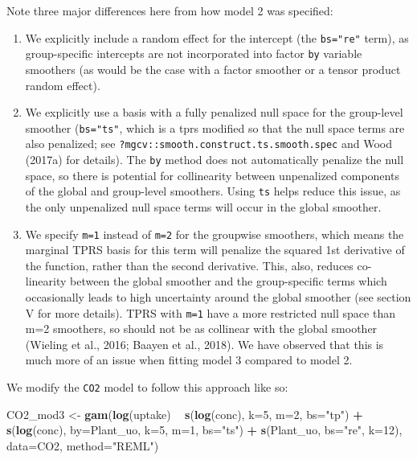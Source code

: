 \documentclass[12pt]{article}
\newenvironment{Shaded}{\begin{snugshade}}{\end{snugshade}}
\newcommand{\KeywordTok}[1]{\textcolor[rgb]{0.13,0.29,0.53}{\textbf{#1}}}
\newcommand{\DataTypeTok}[1]{\textcolor[rgb]{0.13,0.29,0.53}{#1}}
\newcommand{\DecValTok}[1]{\textcolor[rgb]{0.00,0.00,0.81}{#1}}
\newcommand{\StringTok}[1]{\textcolor[rgb]{0.31,0.60,0.02}{#1}}
\newcommand{\OperatorTok}[1]{\textcolor[rgb]{0.81,0.36,0.00}{\textbf{#1}}}
\newcommand{\NormalTok}[1]{#1}
\providecommand{\tightlist}{%
  \setlength{\itemsep}{0pt}\setlength{\parskip}{0pt}}
\begin{document}
Note three major differences here from how model 2 was specified:

\begin{enumerate}
\def\labelenumi{\arabic{enumi}.}
\tightlist
\item
  We explicitly include a random effect for the intercept (the
  \texttt{bs="re"} term), as group-specific intercepts are not
  incorporated into factor \texttt{by} variable smoothers (as would be
  the case with a factor smoother or a tensor product random effect).
\item
  We explicitly use a basis with a fully penalized null space for the
  group-level smoother (\texttt{bs="ts"}, which is a tprs modified so
  that the null space terms are also penalized; see
  \texttt{?mgcv::smooth.construct.ts.smooth.spec} and Wood (2017a) for
  details). The \texttt{by} method does not automatically penalize the
  null space, so there is potential for collinearity between unpenalized
  components of the global and group-level smoothers. Using \texttt{ts}
  helps reduce this issue, as the only unpenalized null space terms will
  occur in the global smoother.
\item
  We specify \texttt{m=1} instead of \texttt{m=2} for the groupwise
  smoothers, which means the marginal TPRS basis for this term will
  penalize the squared 1st derivative of the function, rather than the
  second derivative. This, also, reduces co-linearity between the global
  smoother and the group-specific terms which occasionally leads to high
  uncertainty around the global smoother (see section V for more
  details). TPRS with \texttt{m=1} have a more restricted null space
  than m=2 smoothers, so should not be as collinear with the global
  smoother (Wieling et al., 2016; Baayen et al., 2018). We have observed
  that this is much more of an issue when fitting model 3 compared to
  model 2.
\end{enumerate}

We modify the \texttt{CO2} model to follow this approach like so:

\begin{Shaded}
\begin{Highlighting}[]
\NormalTok{CO2_mod3 <-}\StringTok{ }\KeywordTok{gam}\NormalTok{(}\KeywordTok{log}\NormalTok{(uptake) }\OperatorTok{~}\StringTok{ }\KeywordTok{s}\NormalTok{(}\KeywordTok{log}\NormalTok{(conc), }\DataTypeTok{k=}\DecValTok{5}\NormalTok{, }\DataTypeTok{m=}\DecValTok{2}\NormalTok{, }\DataTypeTok{bs=}\StringTok{"tp"}\NormalTok{) }\OperatorTok{+}
\StringTok{                  }\KeywordTok{s}\NormalTok{(}\KeywordTok{log}\NormalTok{(conc), }\DataTypeTok{by=}\NormalTok{Plant_uo, }\DataTypeTok{k=}\DecValTok{5}\NormalTok{, }\DataTypeTok{m=}\DecValTok{1}\NormalTok{, }\DataTypeTok{bs=}\StringTok{"ts"}\NormalTok{) }\OperatorTok{+}
\StringTok{                  }\KeywordTok{s}\NormalTok{(Plant_uo, }\DataTypeTok{bs=}\StringTok{"re"}\NormalTok{, }\DataTypeTok{k=}\DecValTok{12}\NormalTok{),}
                \DataTypeTok{data=}\NormalTok{CO2, }\DataTypeTok{method=}\StringTok{"REML"}\NormalTok{)}
\end{Highlighting}
\end{Shaded}
\end{document}
